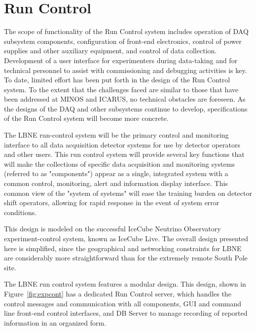 \section{Run Control }
\label{sec:daq_runcontrol}

 The scope of functionality
of the Run Control system includes operation of DAQ subsystem
components, configuration of front-end electronics, control of power
supplies and other auxiliary equipment, and control of data
collection.  Development of a user interface for experimenters during
data-taking and for technical personnel to assist with commissioning
and debugging activities is key.  To date, limited effort has been put
forth in the design of the Run Control system.  To the extent that the
challenges faced are similar to those that have been addressed at
MINOS and ICARUS, no technical obstacles are foreseen.  As the designs
of the DAQ and other subsystems continue to develop, specifications of
the Run Control system will become more concrete.

The LBNE run-control system will be the primary control and monitoring
interface to all data acquisition detector systems for use by detector
operators and other users.  This run control system will provide
several key functions that will make the collections of specific data
acquisition and monitoring systems (referred to as "components")
appear as a single, integrated system with a common control,
monitoring, alert and information display interface.  This common view
of the "system of systems" will ease the training burden on detector
shift operators, allowing for rapid response in the event of system
error conditions.

This design is modeled on the successful IceCube Neutrino Observatory
experiment-control system, known as IceCube
Live\cite{comp:icecube-live}.  The overall design presented here is
simplified, since the geographical and networking constraints for LBNE
are considerably more straightforward than for the extremely remote
South Pole site.


The LBNE run control system features a modular design.  This design,
shown in Figure~\ref{fig:expcont} has a dedicated Run Control server,
which handles the control messages and communication with all
components, GUI and command line front-end control interfaces, and DB
Server to manage recording of reported information in an organized
form.

